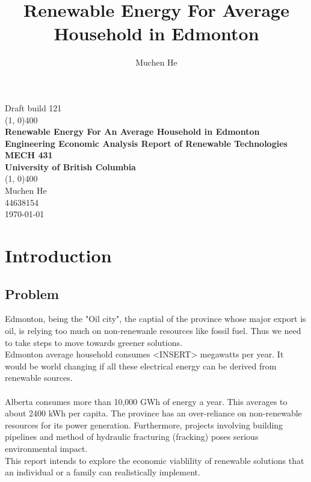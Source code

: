 \documentclass[10pt,letterpaper]{article}
\author{Muchen He}
\title{Renewable Energy For Average Household in Edmonton}
\begin{document}
\begin{titlepage}
	\begin{center}
		Draft build 121\\
		\vspace*{3in}
		\line(1, 0){400}\\
		\Huge{\textbf{Renewable Energy For An Average Household in Edmonton}}\\[0.2cm]
		\large{\textbf{Engineering Economic Analysis Report of Renewable Technologies}}\\[1cm]
		\Large{\textbf{MECH 431}}\\
		\textbf{University of British Columbia}\\
		\line(1, 0){400}\\
		\vfill
		\Large{Muchen He}\\
		44638154\\

		\today\\
	\end{center}
\end{titlepage}

\setcounter{secnumdepth}{3}
\tableofcontents
\thispagestyle{empty}
\clearpage

\thispagestyle{empty}
\listoffigures
\listoftables
\newpage

\setcounter{page}{1}

\section{Introduction}\label{section:introduction}

\subsection{Problem}

Edmonton, being the "Oil city", the captial of the province whose major export is oil, is relying too much on non-renewanle resources like fossil fuel. Thus we need to take steps to move towards greener solutions.\\

Edmonton average household consumes <INSERT> megawatts per year. It would be world changing if all these electrical energy can be derived from renewable sources.\\
\\
Alberta consumes more than 10,000 GWh of energy a year. This averages to about 2400 kWh per capita\cite{average-albertan-consumption}. The province has an over-reliance on non-renewable resources for its power generation. Furthermore, projects involving building pipelines and method of hydraulic fracturing (fracking) poses serious environmental impact\cite{fracking-kurzgesagt}.
\\
This report intends to explore the economic viablility of renewable solutions that an individual or a family can realistically implement.\\
\\
\end{document}
